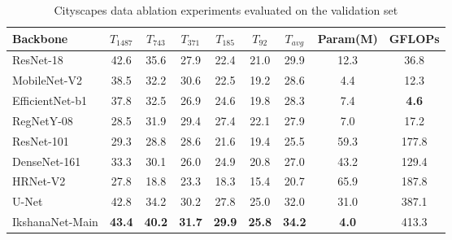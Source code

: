 \documentclass{article}
\begin{document}
\begin{table}[ht]
\caption{Cityscapes data ablation experiments evaluated on the validation set}
\begin{center}
\begin{adjustbox}{width=1\textwidth}
  \begin{tabular}{lSSSSSSSS}
    \toprule
     {Backbone} &
     {$T_{1487}$} & {$T_{743}$} & {$T_{371}$} & {$T_{185}$} & {$T_{92}$} & {\textbf{$T_{avg}$}} & {Param(M)} &{GFLOPs}  \\
      \midrule
    ResNet-18  \cite{he2016deep} & 42.6 & 35.6 & 27.9 & 22.4 & 21.0 & 29.9 & 12.3 & 36.8 \\
MobileNet-V2 \cite{mobileNetV2} & 38.5 & 32.2 & 30.6 & 22.5 & 19.2 & 28.6 &  4.4& 12.3 \\
    EfficientNet-b1 \cite{TanL19} & 37.8 & 32.5 & 26.9 & 24.6 & 19.8 & 28.3 & 7.4 & \bfseries 4.6 \\
    RegNetY-08 \cite{RegNet} &  28.5& 31.9 & 29.4 & 27.4 & 22.1 & 27.9  & 7.0 & 17.2 \\
    ResNet-101 \cite{he2016deep} & 29.3 & 28.8 & 28.6 & 21.6 & 19.4 & 25.5 & 59.3 & 177.8 \\
    DenseNet-161 \cite{huang2017densely} & 33.3 & 30.1 & 26.0 & 24.9 & 20.8 & 27.0 & 43.2 & 129.4 \\
    HRNet-V2 \cite{SunZJCXLMWLW19} & 27.8 & 18.8 & 23.3 & 18.3 & 15.4 & 20.7 & 65.9 & 187.8 \\
    U-Net\cite{ronneberger2015u} & 42.8 & 34.2 & 30.2 & 27.8 & 25.0 & 32.0 & 31.0 & 387.1 \\
    IkshanaNet-Main &  \bfseries 43.4 & \bfseries 40.2 & \bfseries 31.7 & \bfseries 29.9 & \bfseries 25.8 &  \bfseries 34.2  & \bfseries 4.0  & 413.3 \\

    \bottomrule 
  \end{tabular}
\end{adjustbox}
\end{center}

 \label{Table2}
\end{table}
\end{document}
